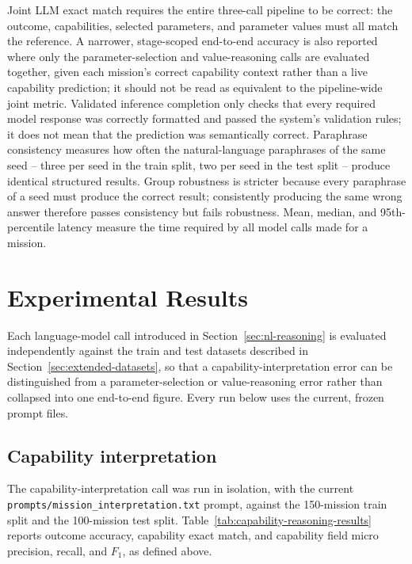 Joint LLM exact match requires the entire three-call pipeline to be correct: the outcome, capabilities, selected parameters, and parameter values must all match the reference. A narrower, stage-scoped end-to-end accuracy is also reported where only the parameter-selection and value-reasoning calls are evaluated together, given each mission's correct capability context rather than a live capability prediction; it should not be read as equivalent to the pipeline-wide joint metric. Validated inference completion only checks that every required model response was correctly formatted and passed the system's validation rules; it does not mean that the prediction was semantically correct.
Paraphrase consistency measures how often the natural-language paraphrases of the same seed -- three per seed in the train split, two per seed in the test split -- produce identical structured results. Group robustness is stricter because every paraphrase of a seed must produce the correct result; consistently producing the same wrong answer therefore passes consistency but fails robustness. Mean, median, and 95th-percentile latency measure the time required by all model calls made for a mission.

\section{Experimental Results}
\label{sec:experimental-progression}

Each language-model call introduced in Section~\ref{sec:nl-reasoning} is evaluated independently against the train and test datasets described in Section~\ref{sec:extended-datasets}, so that a capability-interpretation error can be distinguished from a parameter-selection or value-reasoning error rather than collapsed into one end-to-end figure. Every run below uses the current, frozen prompt files.

\subsection{Capability interpretation}

The capability-interpretation call was run in isolation, with the current \texttt{prompts/mission\_interpretation.txt} prompt, against the 150-mission train split and the 100-mission test split. Table~\ref{tab:capability-reasoning-results} reports outcome accuracy, capability exact match, and capability field micro precision, recall, and $F_1$, as defined above.

